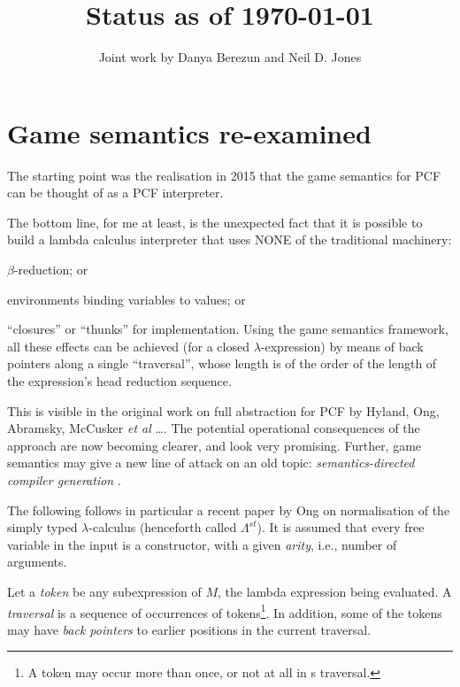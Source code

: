 \documentclass{llncs}
\title{Status as of  
\today}
\author {Joint work by Danya Berezun and Neil D. Jones}
\institute{DIKU}
\begin{document}

\setcounter{tocdepth}{3}

\maketitle

\section{Game semantics re-examined}

The starting point was the realisation  in 2015 that the game semantics for PCF can be thought of as a PCF interpreter. 

The bottom line, for me at least, is the unexpected fact that it is possible to build a lambda calculus interpreter that uses NONE of the traditional machinery: 
\bi
\item $\beta$-reduction; or 
\item environments binding variables to values; or 
\item ``closures'' or  ``thunks''  for implementation.
\ei
Using the game semantics framework, all these effects can be achieved (for a closed $\lambda$-expression)  by means of back pointers along a single ``traversal'', whose length is of the order of the length of the expression's head reduction sequence. 

This is visible in the original work on full abstraction for PCF by Hyland, Ong, Abramsky, McCusker {\em et al}
\cite{DBLP:journals/iandc/HylandO00,abramskyMcCusker97,DBLP:conf/tacs/AbramskyMJ94}\ldots. The potential operational consequences of the approach are  now becoming clearer, and look very promising. Further, game semantics may give a new line of attack on an old topic: {\em semantics-directed compiler generation}
\cite{DBLP:conf/cc/1980,DBLP:conf/cc/Schmidt80}.

The following follows in particular a recent paper \cite{ong2015} by  Ong on normalisation of the simply typed $\lambda$-calculus (henceforth called $\Lambda^{st}$). It is assumed that every free variable in the input is a constructor, with a given {\em arity}, i.e., number of arguments.

Let a {\em token} be any subexpression of $M$, the lambda expression being evaluated.
A {\em traversal} is a sequence of occurrences of 
tokens\footnote{A token may occur more than once, or not at all in s traversal.}. 
In addition, some of the tokens may have {\em back pointers} to earlier positions in the current traversal. 
\end{document}
